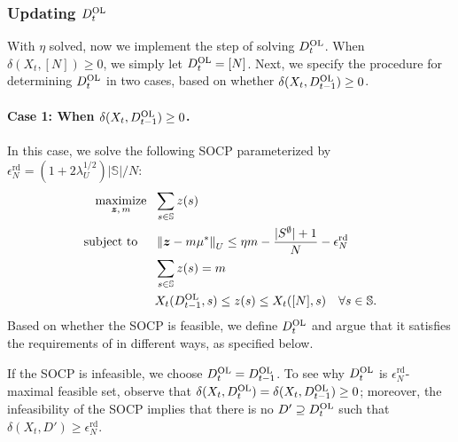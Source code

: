 \documentclass[11pt,letterpaper]{article}
\theoremstyle{plain}
\theoremstyle{definition}
\theoremstyle{remark}
\newcommand{\norm}[1]{\left\lVert#1\right\rVert}
\newcommand{\ve}[1]{\bm{#1}}
\newcommand{\sspa}{\mathbb{S}}
\newcommand{\sums}{\sum_{s\in\sspa}}
\newcommand{\sempty}{S^{\emptyset}}
\newcommand{\statdist}{\mu^*}
\newcommand{\umat}{U}
\newcommand{\errtol}{\epsilon_N^{\text{rd}}}
\newcommand{\lamu}{\lambda_\umat}
\newcommand{\Db}{D^{\textup{OL}}}
\newcommand{\slk}{\delta}
\begin{document}
\subsubsection{Updating $\Db_t$}

With $\eta$ solved, now we implement the step of solving $\Db_t$. 
When $\slk(X_t, [N]) \geq 0$, we simply let $\Db_t = [N]$. Next, we specify the procedure for determining $\Db_t$ in two cases, based on whether $\slk(X_t, \Db_{t-1}) \geq 0$. 

\paragraph{Case 1: When $\slk(X_t, \Db_{t-1}) \geq 0$.}
In this case, we solve the following SOCP parameterized by $\errtol =  (1+2\lamu^{1/2})|\sspa| / N$:
\begin{subequations}
\begin{align}
    \underset{\ve{z},\, m}{\text{maximize}}  \mspace{12mu}& \sums z(s) \\
    \text{subject to}\mspace{25mu}
    & \norm{\ve{z} - m \statdist}_{\umat} \leq  \eta m -  \frac{|\sempty|+1}{N} - \errtol \label{eq:slack-constraint-socp-restate-2} \\
    & \sums z(s) = m \\
    & X_t(\Db_{t-1}, s) \leq z(s) \leq X_t([N], s)  \quad \forall s\in\sspa.
\end{align}
\end{subequations}
Based on whether the SOCP is feasible, we define $\Db_t$ and argue that it satisfies the requirements of  in different ways, as specified below. 

If the SOCP is infeasible, we choose $\Db_t = \Db_{t-1}$. To see why $\Db_t$ is $\errtol$-maximal feasible set, observe that $\slk(X_t, \Db_t) = \slk(X_t, \Db_{t-1}) \geq 0$; moreover, the infeasibility of the SOCP implies that there is no $D'\supseteq \Db_t$ such that $\slk(X_t, D') \geq \errtol$. 
\end{document}

